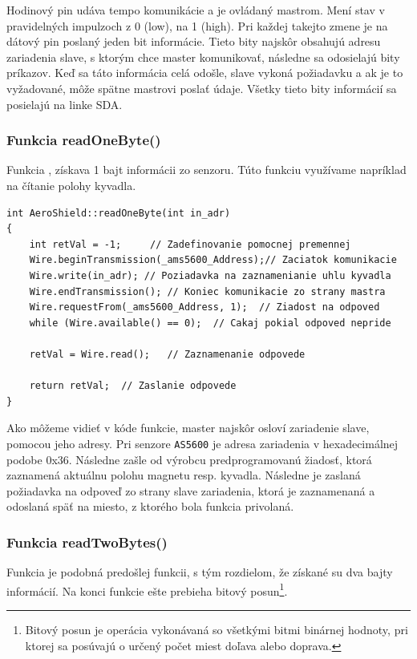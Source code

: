 Hodinový pin udáva tempo komunikácie a je ovládaný mastrom. Mení stav v pravidelných impulzoch z 0 (low), na 1 (high). Pri každej takejto zmene je na dátový pin poslaný jeden bit informácie. Tieto bity najskôr obsahujú adresu zariadenia slave, s ktorým chce master komunikovať, následne sa odosielajú bity príkazov. Keď sa táto informácia celá odošle, slave vykoná požiadavku a ak je to vyžadované, môže spätne mastrovi poslať údaje. Všetky tieto bity informácií sa posielajú na linke SDA\cite{idvac}.

   

\subsubsection{Funkcia readOneByte()}

 Funkcia , získava 1 bajt informácii zo senzoru. Túto funkciu využívame napríklad na čítanie polohy kyvadla. 

\begin{lstlisting}[caption={Zdrojový kód funkcie readOneByte.},captionpos=b]
int AeroShield::readOneByte(int in_adr)         
{
	int retVal = -1;	 // Zadefinovanie pomocnej premennej
	Wire.beginTransmission(_ams5600_Address);// Zaciatok komunikacie 
	Wire.write(in_adr);	// Poziadavka na zaznamenianie uhlu kyvadla 
	Wire.endTransmission();	// Koniec komunikacie zo strany mastra
	Wire.requestFrom(_ams5600_Address, 1);	// Ziadost na odpoved  
	while (Wire.available() == 0);	// Cakaj pokial odpoved nepride  
	
	retVal = Wire.read();	// Zaznamenanie odpovede 
	
	return retVal;	// Zaslanie odpovede 
}
\end{lstlisting}

Ako môžeme vidieť v kóde funkcie, master najskôr osloví zariadenie slave, pomocou jeho adresy. Pri senzore \verb|AS5600| je adresa zariadenia v hexadecimálnej podobe 0x36. Následne zašle od výrobcu predprogramovanú žiadosť, ktorá zaznamená aktuálnu polohu magnetu resp. kyvadla. Následne je zaslaná požiadavka na odpoveď zo strany slave zariadenia, ktorá je zaznamenaná a odoslaná späť na miesto, z ktorého bola funkcia privolaná.

\subsubsection{Funkcia readTwoBytes()}

Funkcia  je podobná predošlej funkcii, s tým rozdielom, že získané su dva bajty informácií. Na konci funkcie ešte prebieha bitový posun\footnote[6]{Bitový posun je operácia vykonávaná so všetkými bitmi binárnej hodnoty, pri ktorej sa posúvajú o určený počet miest doľava alebo doprava\cite{biteShift}.}. 

